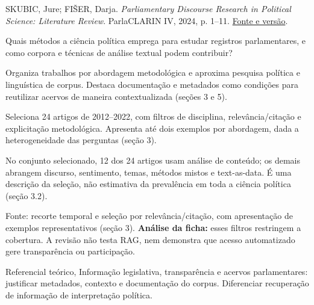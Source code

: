 {\small SKUBIC, Jure; FIŠER, Darja. \textit{Parliamentary Discourse Research in Political Science: Literature Review}. ParlaCLARIN IV, 2024, p. 1--11. \href{https://aclanthology.org/2024.parlaclarin-1.1/}{Fonte e versão}.\par}

Quais métodos a ciência política emprega para estudar registros parlamentares, e como corpora e técnicas de análise textual podem contribuir?

Organiza trabalhos por abordagem metodológica e aproxima pesquisa política e linguística de corpus. Destaca documentação e metadados como condições para reutilizar acervos de maneira contextualizada (seções 3 e 5).

Seleciona 24 artigos de 2012--2022, com filtros de disciplina, relevância/citação e explicitação metodológica. Apresenta até dois exemplos por abordagem, dada a heterogeneidade das perguntas (seção 3).

No conjunto selecionado, 12 dos 24 artigos usam análise de conteúdo; os demais abrangem discurso, sentimento, temas, métodos mistos e text-as-data. É uma descrição da seleção, não estimativa da prevalência em toda a ciência política (seção 3.2).

\begin{itemize}
\end{itemize}

Fonte: recorte temporal e seleção por relevância/citação, com apresentação de exemplos representativos (seção 3). \textbf{Análise da ficha:} esses filtros restringem a cobertura. A revisão não testa RAG, nem demonstra que acesso automatizado gere transparência ou participação.

Referencial teórico, Informação legislativa, transparência e acervos parlamentares: justificar metadados, contexto e documentação do corpus. Diferenciar recuperação de informação de interpretação política.

